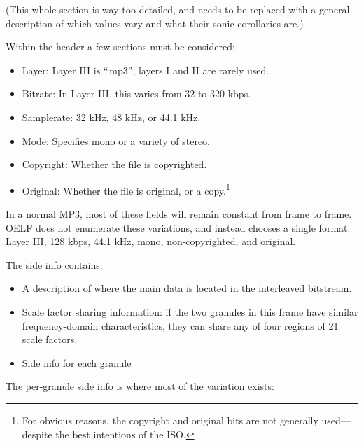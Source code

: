 \documentclass{thesis}
\begin{document}
	(This whole section is way too detailed, and needs to be replaced with a general description of which values vary and what their sonic corollaries are.)
	
	Within the header a few sections must be considered:
	
\begin{itemize}
	\item Layer: Layer III is ``.mp3'', layers I and II are rarely used.
	\item Bitrate: In Layer III, this varies from 32 to 320 kbps.
	\item Samplerate: 32 kHz, 48 kHz, or 44.1 kHz.
	\item Mode: Specifies mono or a variety of stereo.
	\item Copyright: Whether the file is copyrighted.
	\item Original: Whether the file is original, or a copy.\footnote{For obvious reasons, the copyright and original bits are not generally used---despite the best intentions of the ISO.}	
\end{itemize}

	In a normal MP3, most of these fields will remain constant from frame to frame. OELF does not enumerate these variations, and instead chooses a single format: Layer III, 128 kbps, 44.1 kHz, mono, non-copyrighted, and original.
	
	The side info contains:
	
\begin{itemize}
	\item A description of where the main data is located in the interleaved bitstream.
	\item Scale factor sharing information: if the two granules in this frame have similar frequency-domain characteristics, they can share any of four regions of 21 scale factors.
	\item Side info for each granule
\end{itemize}

	The per-granule side info is where most of the variation exists:
	
\end{document}
